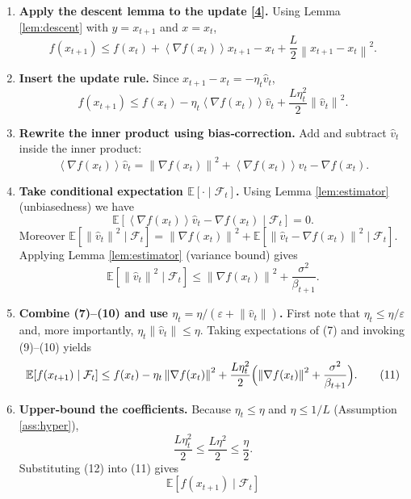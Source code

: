\documentclass[11pt]{article}
\newcommand{\EE}{\mathbb{E}}
\newcommand{\norm}[1]{\left\|#1\right\|}
\newcommand{\inner}[1]{\left\langle #1 \right\rangle}
\newcommand{\grad}{\nabla}
\begin{document}
\begin{enumerate}[leftmargin=*,label=[Step \arabic*]]
\item \textbf{Apply the descent lemma to the update \eqref{4}.}  
    Using Lemma \ref{lem:descent} with $y=x_{t+1}$ and $x=x_{t}$,
    \[
    f(x_{t+1})\le f(x_{t})+\inner{\grad f(x_{t})}{x_{t+1}-x_{t}}
                +\frac{L}{2}\norm{x_{t+1}-x_{t}}^{2}.
    \tag{6}
    \]
\item \textbf{Insert the update rule.}  
    Since $x_{t+1}-x_{t}= -\eta_{t}\hat v_{t}$,
    \[
    f(x_{t+1})\le f(x_{t})-\eta_{t}\inner{\grad f(x_{t})}{\hat v_{t}}
                +\frac{L\eta_{t}^{2}}{2}\norm{\hat v_{t}}^{2}.
    \tag{7}
    \]
\item \textbf{Rewrite the inner product using bias‑correction.}  
    Add and subtract $\hat v_{t}$ inside the inner product:
    \[
    \inner{\grad f(x_{t})}{\hat v_{t}}
    =\norm{\grad f(x_{t})}^{2}
     +\inner{\grad f(x_{t})}{\hat v_{t}-\grad f(x_{t})}.
    \tag{8}
    \]
\item \textbf{Take conditional expectation $\EE[\cdot\mid\mathcal{F}_{t}]$.}  
    Using Lemma \ref{lem:estimator} (unbiasedness) we have
    \[
    \EE\!\left[\inner{\grad f(x_{t})}{\hat v_{t}-\grad f(x_{t})}
                \mid\mathcal{F}_{t}\right]=0 .
    \tag{9}
    \]
    Moreover $\EE[\norm{\hat v_{t}}^{2}\mid\mathcal{F}_{t}]
      =\norm{\grad f(x_{t})}^{2}
        +\EE\!\left[\norm{\hat v_{t}-\grad f(x_{t})}^{2}\mid\mathcal{F}_{t}\right]$.
    Applying Lemma \ref{lem:estimator} (variance bound) gives
    \[
    \EE\!\left[\norm{\hat v_{t}}^{2}\mid\mathcal{F}_{t}\right]
    \le \norm{\grad f(x_{t})}^{2}+ \frac{\sigma^{2}}{\beta_{t+1}} .
    \tag{10}
    \]
\item \textbf{Combine (7)–(10) and use $\eta_{t}= \eta/(\varepsilon+\norm{\hat v_{t}})$.}
    First note that $\eta_{t}\le \eta/ \varepsilon$ and, more importantly,
    $\eta_{t}\norm{\hat v_{t}}\le\eta$.
    Taking expectations of (7) and invoking (9)–(10) yields
    \[
    \EE\!\left[f(x_{t+1})\mid\mathcal{F}_{t}\right]
    \le f(x_{t})
       -\eta_{t}\norm{\grad f(x_{t})}^{2}
       +\frac{L\eta_{t}^{2}}{2}
          \Bigl(\norm{\grad f(x_{t})}^{2}+ \frac{\sigma^{2}}{\beta_{t+1}}\Bigr).
    \tag{11}
    \]
\item \textbf{Upper‑bound the coefficients.}  
    Because $\eta_{t}\le\eta$ and $\eta\le 1/L$ (Assumption \ref{ass:hyper}),
    \[
    \frac{L\eta_{t}^{2}}{2}\le\frac{L\eta^{2}}{2}\le\frac{\eta}{2}.
    \tag{12}
    \]
    Substituting (12) into (11) gives
    \[
    \EE\!\left[f(x_{t+1})\mid\mathcal{F}_{t}\right]
\]
\end{enumerate}
\end{document}
